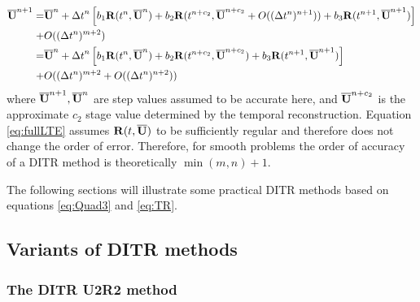\documentclass[preprint,12pt]{elsarticle}
\begin{document}
\begin{equation}
    \begin{aligned}
        \overline{\mathbf{U}}^{n+1} = & \overline{\mathbf{U}}^{n} + {\mathrm\Delta t}^{n}
        \left[
            b_1\mathbf{R}(t^n, \overline{\mathbf{U}}^n)
            +
            b_2\mathbf{R}(t^{n+c_2}, \overline{\mathbf{U}}^{n+c_2} + O((\mathrm\Delta t^{n})^{n+1} ))
            +
            b_3\mathbf{R}(t^{n+1}, \overline{\mathbf{U}}^{n+1})
            \right]
        \\ + &
        O((\mathrm\Delta t^{n})^{m+2} )               \\
        =           &
        \overline{\mathbf{U}}^{n} + {\mathrm\Delta t}^{n}
        \left[
            b_1\mathbf{R}(t^n, \overline{\mathbf{U}}^n)
            +
            b_2\mathbf{R}(t^{n+c_2}, \overline{\mathbf{U}}^{n+c_2})
            +
            b_3\mathbf{R}(t^{n+1}, \overline{\mathbf{U}}^{n+1})
            \right]
        \\ + &
        O((\mathrm\Delta t^{n})^{m+2}  + O((\mathrm\Delta t^{n})^{n+2} ))
    \end{aligned}
    \label{eq:fullLTE}
\end{equation}
where $\overline{\mathbf{U}}^{n+1}, \overline{\mathbf{U}}^{n}$ are step values assumed to be accurate here, and
$\overline{\mathbf{U}}^{n+c_2}$ is the approximate
$c_2$ stage value determined by the temporal reconstruction.
Equation \eqref{eq:fullLTE} assumes
$\mathbf{R}(t, \overline{\mathbf{U}})$ to be sufficiently regular and therefore does not
change the order of error.
Therefore, for smooth problems the
order of accuracy of a DITR
method is theoretically $\min(m,n) + 1$.

The following sections will illustrate some
practical DITR methods based on equations \eqref{eq:Quad3} and \eqref{eq:TR}.


\subsection{Variants of DITR methods}



\subsubsection{The DITR U2R2 method}
\end{document}

